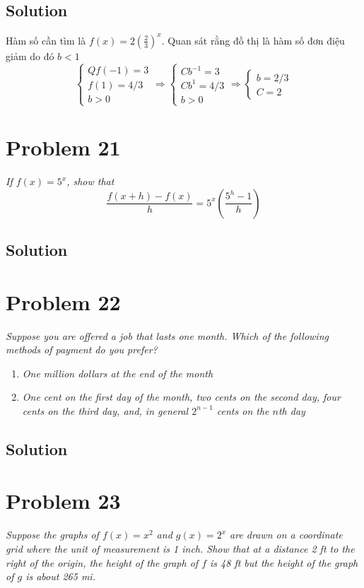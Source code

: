 \documentclass[11pt]{article}
\newcommand{\soln}{\subsection*}
\newcommand{\qn}{\textit}
\begin{document}
\soln{Solution}
Hàm số cần tìm là $f(x)=2(\frac{2}{3})^x$. Quan sát rằng đồ thị là hàm số đơn điệu giảm do đó $b<1$
\begin{equation*}
	\begin{cases}Q
		f(-1)=3 \\
		f(1)=4/3 \\
		b > 0
	\end{cases}
	\Rightarrow
	\begin{cases}
		Cb^{-1}=3 \\
		Cb^1=4/3 \\
		b > 0
	\end{cases}
	\Rightarrow
	\begin{cases}
		b=2/3 \\
		C=2
	\end{cases}
\end{equation*}

\section*{Problem 21}

\qn{If $f(x)=5^x$, show that $$\frac{f(x+h)-f(x)}{h}=5^x(\frac{5^h-1}{h})$$}

\soln{Solution}

\section*{Problem 22}

\qn{Suppose you are offered a job that lasts one month. Which of the following methods of payment do you prefer?}
\begin{enumerate}
	\item \qn{One million dollars at the end of the month}
	
	\item \qn{One cent on the first day of the month, two cents on the second day, four cents on the third day, and, in general $2^{n-1}$ cents on the $n$th day}
\end{enumerate}

\soln{Solution}

\section*{Problem 23}

\qn{Suppose the graphs of $f(x)=x^2$ and $g(x)=2^x$ are drawn on a coordinate grid where the unit of measurement is 1 inch. Show that at a distance 2 ft to the right of the origin, the height of the graph of $f$ is 48 ft but the height of the graph of $g$ is about 265 mi.}
\end{document}
